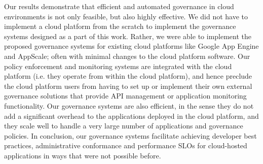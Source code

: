 Our results demonstrate that efficient and automated governance in cloud environments
is not only feasible, but also highly effective. We did not have to implement a cloud platform from the 
scratch to implement the governance systems designed as a part of this work. Rather,
we were able to implement the proposed governance systems for existing cloud platforms
like Google App Engine and AppScale; often with minimal changes to the cloud platform
software. Our policy enforcement and monitoring systems are integrated with the cloud platform 
(i.e. they operate from within the cloud platform), and hence preclude 
the cloud platform users from having to set up or
implement their own external governance solutions that provide API management or
application monitoring functionality. Our governance systems are also efficient, in the 
sense they do not add a significant overhead to the applications deployed in the cloud
platform, and they scale well to handle a very large number of applications and governance
policies. In conclusion, our governance systems facilitate achieving developer best practices, 
administrative conformance and performance SLOs for cloud-hosted applications in ways
that were not possible before.